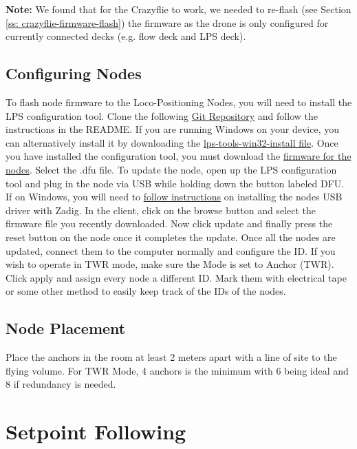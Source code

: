 \documentclass[]{article}
\begin{document}
{\bfseries Note:} We found that for the Crazyflie to work, we needed to re-flash (see Section \ref{ss: crazyflie-firmware-flash}) the firmware as the drone is only configured for currently connected decks (e.g. flow deck and LPS deck). \\

\subsection{Configuring Nodes}

\noindent To flash node firmware to the Loco-Positioning Nodes, you will need to install the LPS configuration tool. Clone the following \href{https://github.com/bitcraze/lps-tools}{Git Repository} and follow the instructions in the README. If you are running Windows on your device, you can alternatively install it by downloading the \href{https://github.com/bitcraze/lps-tools/releases}{lps-tools-win32-install file}. Once you have installed the configuration tool, you must download the \href{https://github.com/bitcraze/lps-node-firmware/releases}{firmware for the nodes}. Select the .dfu file. To update the node, open up the LPS configuration tool and plug in the node via USB while holding down the button labeled DFU. If on Windows, you will need to \href{https://wiki.bitcraze.io/misc:usbwindows}{follow instructions} on installing the nodes USB driver with Zadig. In the client, click on the browse button and select the firmware file you recently downloaded. Now click update and finally press the reset button on the node once it completes the update. Once all the nodes are updated, connect them to the computer normally and configure the ID. If you wish to operate in TWR mode, make sure the Mode is set to Anchor (TWR). Click apply and assign every node a different ID. Mark them with electrical tape or some other method to easily keep track of the IDs of the nodes.

\subsection{Node Placement}

\noindent Place the anchors in the room at least 2 meters apart with a line of site to the flying volume. For TWR Mode, 4 anchors is the minimum with 6 being ideal and 8 if redundancy is needed.

\section{Setpoint Following}
\end{document}
